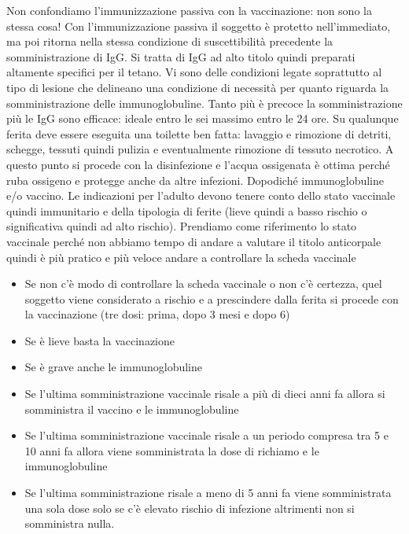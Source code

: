   Non confondiamo l'immunizzazione passiva con la vaccinazione: non sono
  la stessa cosa! Con l'immunizzazione passiva il soggetto è protetto
  nell'immediato, ma poi ritorna nella stessa condizione di
  suscettibilità precedente la somministrazione di IgG. Si tratta di IgG
  ad alto titolo quindi preparati altamente specifici per il tetano. Vi
  sono delle condizioni legate soprattutto al tipo di lesione che
  delineano una condizione di necessità per quanto riguarda la
  somministrazione delle immunoglobuline. Tanto più è precoce la
  somministrazione più le IgG sono efficace: ideale entro le sei massimo
  entro le 24 ore. Su qualunque ferita deve essere eseguita una toilette
  ben fatta: lavaggio e rimozione di detriti, schegge, tessuti quindi
  pulizia e eventualmente rimozione di tessuto necrotico. A questo punto
  si procede con la disinfezione e l'acqua ossigenata è ottima perché
  ruba ossigeno e protegge anche da altre infezioni. Dopodiché
  immunoglobuline e/o vaccino. Le indicazioni per l'adulto devono tenere
  conto dello stato vaccinale quindi immunitario e della tipologia di
  ferite (lieve quindi a basso rischio o significativa quindi ad alto
  rischio). Prendiamo come riferimento lo stato vaccinale perché non
  abbiamo tempo di andare a valutare il titolo anticorpale quindi è più
  pratico e più veloce andare a controllare la scheda vaccinale

\begin{itemize}
\item
  Se non c'è modo di controllare la scheda vaccinale o non c'è certezza,
  quel soggetto viene considerato a rischio e a prescindere dalla ferita
  si procede con la vaccinazione (tre dosi: prima, dopo 3 mesi e dopo 6)
\item
  Se è lieve basta la vaccinazione
\item
  Se è grave anche le immunoglobuline
\item
  Se l'ultima somministrazione vaccinale risale a più di dieci anni fa
  allora si somministra il vaccino e le immunoglobuline
\item
  Se l'ultima somministrazione vaccinale risale a un periodo compresa
  tra 5 e 10 anni fa allora viene somministrata la dose di richiamo e le
  immunoglobuline
\item
  Se l'ultima somministrazione risale a meno di 5 anni fa viene
  somministrata una sola dose solo se c'è elevato rischio di infezione
  altrimenti non si somministra nulla.
\end{itemize}


